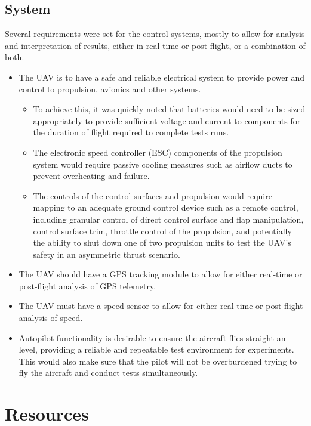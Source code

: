 \documentclass[../../main.tex]{subfiles}
\begin{document}
\subsection{System} \label{sec:design-specification:requirements:system}

Several requirements were set for the control systems, mostly to allow for analysis and interpretation of results, either in real time or post-flight, or a combination of both. 

\begin{itemize}
    \item The UAV is to have a safe and reliable electrical system to provide power and control to propulsion, avionics and other systems.
        \begin{itemize}
            \item To achieve this, it was quickly noted that batteries would need to be sized appropriately to provide sufficient voltage and current to components for the duration of flight required to complete tests runs. 
            \item The electronic speed controller (ESC) components of the propulsion system would require passive cooling measures such as airflow ducts to prevent overheating and failure. 
            \item The controls of the control surfaces and propulsion would require mapping to an adequate ground control device such as a remote control, including granular control of direct control surface and flap manipulation, control surface trim, throttle control of the propulsion, and potentially the ability to shut down one of two propulsion units to test the UAV’s safety in an asymmetric thrust scenario. 
        \end{itemize}
    \item The UAV should have a GPS tracking module to allow for either real-time or post-flight analysis of GPS telemetry. 
    \item The UAV must have a speed sensor to allow for either real-time or post-flight analysis of speed. 
    \item Autopilot functionality is desirable to ensure the aircraft flies straight an level, providing a reliable and repeatable test environment for experiments.
        This would also make sure that the pilot will not be overburdened trying to fly the aircraft and conduct tests simultaneously.
\end{itemize}

\section{Resources} \label{sec:introduction:resources}
\end{document}
